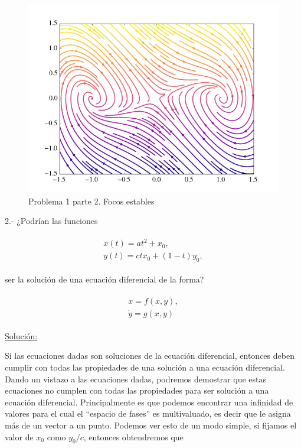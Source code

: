 \documentclass[a4paper,10pt]{article}
\begin{document}
\begin{figure}[h!]
 \centering
\includegraphics[scale=0.3]{problema1fig4}
\caption{Problema 1 parte 2. Focos estables}
\label{fig:problema1fig4}
\end{figure}




\vspace{.3cm}

2.- ¿Podrían las funciones 

\begin{gather*}
 \begin{split}
 x(t) = at^2 + x_0, \\
 y(t) = ctx_0 + (1-t)y_0,
 \end{split}
\end{gather*}

ser la solución de una ecuación diferencial de la forma?

\begin{gather*}
 \begin{split}
 \dot{x} = f(x,y), \\
 \dot{y} = g(x,y)
 \end{split}
\end{gather*}

\vspace{.3cm}

\underline{Solución:}

Si las ecuaciones dadas son soluciones de la ecuación diferencial, entonces deben
cumplir con todas las propiedades de una solución a una ecuación diferencial. Dando
un vistazo a las ecuaciones dadas, podremos demostrar que estas ecuaciones no cumplen
con todas las propiedades para ser solución a una ecuación diferencial. Principalmente
es que podemos encontrar una infinidad de valores para el cual el ``espacio de fases'' es 
multivaluado, es decir que le asigna más de un vector a un punto. Podemos ver esto de un 
modo simple, si fijamos el valor de $x_0$ como $y_0/c$, entonces obtendremos que
\end{document}
